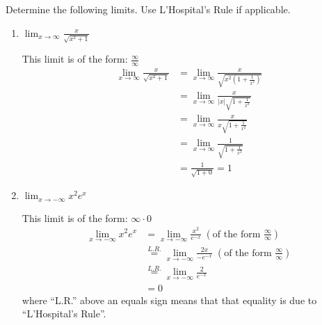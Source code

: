 \documentclass[nooutcomes,handout]{ximera}
\begin{document}
\begin{problem}
  Determine the following limits.
  Use L'Hospital's Rule if applicable.
  \begin{enumerate}
  
  \item  $\lim_{x \to \infty} \frac{x}{\sqrt{x^2 + 1}}  $

    \begin{freeResponse}
    
    This limit is of the form:  $\frac{\infty}{\infty}$
      \begin{align*}
        \lim_{x \to \infty} \frac{x}{\sqrt{x^2 + 1}} &= \lim_{x \to \infty} \frac{x}{\sqrt{x^2 \left(1 + \frac{1}{x^2} \right)}} \\
                                                     &=  \lim_{x \to \infty} \frac{x}{|x| \sqrt{1 + \frac{1}{x^2} }} \\
                                                     &=  \lim_{x \to \infty} \frac{x}{x \sqrt{1 + \frac{1}{x^2} }} \\
                                                     &=  \lim_{x \to \infty} \frac{1}{\sqrt{1 + \frac{1}{x^2} }} \\
                                                     &= \frac{1}{\sqrt{1 + 0}} = 1
      \end{align*}
    \end{freeResponse}
    
    
  \item  $\lim_{x \to - \infty} x^2 e^x $
    \begin{freeResponse}
    This limit is of the form: $\infty \cdot 0$
      \begin{align*}
        \lim_{x \to - \infty} x^2 e^x &= \lim_{x \to - \infty} \frac{x^2}{ e^{-x}} \; \left( \text{of the form } \frac{\infty}{\infty} \right) \\
                                      &\stackrel{L.R.}{=}  \lim_{x \to - \infty} \frac{2x}{- e^{-x}} \; \left( \text{of the form } \frac{\infty}{\infty} \right) \\
                                      &\stackrel{L.R.}{=}  \lim_{x \to - \infty} \frac{2}{ e^{-x}}  \\
                                      &= 0
      \end{align*}
      where ``L.R.'' above an equals sign means that that equality is due to ``L'Hospital's Rule''.  
    \end{freeResponse}
    

\end{enumerate}
\end{problem}
\end{document}
